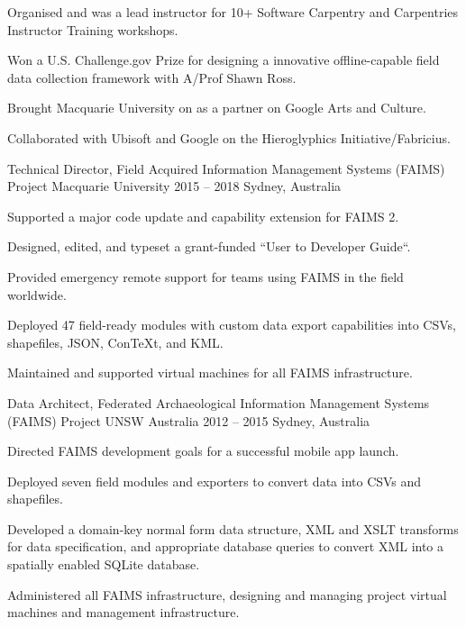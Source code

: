 \begin{cventries}
{\begin{cvitems}
    \item {Organised and was a lead instructor for 10+ Software Carpentry and Carpentries Instructor Training workshops.}
    \item {Won a U.S. Challenge.gov Prize for designing a innovative offline-capable field data collection framework with A/Prof Shawn Ross.}
    \item {Brought Macquarie University on as a partner on Google Arts and Culture.}
    \item {Collaborated with Ubisoft and Google on the Hieroglyphics Initiative/Fabricius.}
    \end{cvitems}%
    }
    \cventry
    {Technical Director, Field Acquired Information Management Systems (FAIMS) Project} %
    {Macquarie University} %
    {2015 -- 2018} %
    {Sydney, Australia} %
    {\begin{cvitems}%
    \item {Supported a major code update and capability extension for FAIMS 2.}
    \item {Designed, edited, and typeset a grant-funded ``User to Developer Guide``.}
    \item {Provided emergency remote support for teams using FAIMS in the field worldwide.}
    \item {Deployed 47 field-ready modules with custom data export capabilities into CSVs, shapefiles, JSON, Con\TeX{}t, and KML.}
    \item {Maintained and supported virtual machines for all FAIMS infrastructure.}
\end{cvitems}}
 
\cventry
    {Data Architect, Federated Archaeological Information Management Systems (FAIMS) Project} %
    {UNSW Australia} %
    {2012 -- 2015} %
    {Sydney, Australia} %
    {\begin{cvitems}%
    \item {Directed FAIMS development goals for a successful mobile app launch.}
    \item {Deployed seven field modules and exporters to convert data into CSVs and shapefiles.}
    \item {Developed a domain-key normal form data structure, XML and XSLT transforms for data specification, and appropriate database queries to convert XML into a spatially enabled SQLite database.}
    \item {Administered all FAIMS infrastructure, designing and managing project virtual machines and management infrastructure.}
    \end{cvitems}}   


\end{cventries}
